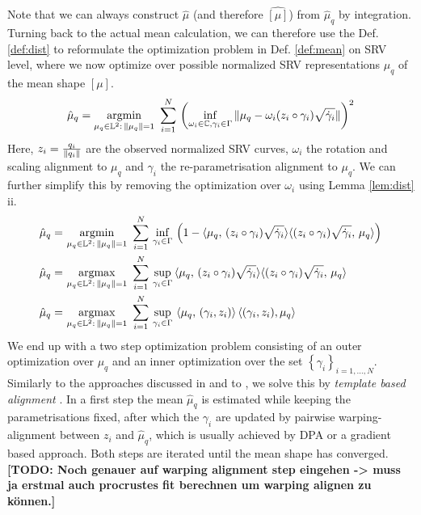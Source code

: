 Note that we can always construct $\hat\mu$ (and therefore $\hat{[\mu]}$) from $\hat\mu_q$ by integration.
Turning back to the actual mean calculation, we can therefore use the Def. \ref{def:dist} to reformulate the optimization problem in Def. \ref{def:mean} on SRV level, where we now optimize over possible normalized SRV representations $\mu_q$ of the mean shape $[\mu]$. 
$$ \hat\mu_q = \operatorname*{argmin}_{\mu_q \in \mathbb{L}^2:\,\lVert\mu_q\rVert = 1}\,\,
  \sum_{i=1}^N \, \left( \inf_{\omega_i \in \mathbb{C}, \gamma_i \in \Gamma} \,
    \lVert\mu_q - \omega_i (z_i \circ \gamma_i) \sqrt{\dot\gamma_i}\rVert \right)^2 $$
Here, $z_i = \frac{q_i}{\lVert q_i\rVert}$ are the observed normalized SRV curves, $\omega_i$ the rotation and scaling alignment to $\mu_q$ and $\gamma_i$ the re-parametrisation alignment to $\mu_q$.
We can further simplify this by removing the optimization over $\omega_i$ using Lemma \ref{lem:dist} ii.
\begin{align*}
  \hat\mu_q = &\, \operatorname*{argmin}_{\mu_q \in \mathbb{L}^2:\,\lVert\mu_q\rVert = 1}\,\,
    \sum_{i=1}^N \,\inf_{\gamma_i \in \Gamma}\, \left(1 - \langle \mu_q,\,(z_i \circ \gamma_i) \sqrt{\dot\gamma_i} \rangle \langle (z_i \circ \gamma_i) \sqrt{\dot\gamma_i},\, \mu_q\rangle \right) \\
  \hat\mu_q = &\, \operatorname*{argmax}_{\mu_q \in \mathbb{L}^2:\,\lVert\mu_q\rVert = 1}\,\,
    \sum_{i=1}^N \,\sup_{\gamma_i \in \Gamma}\, \langle \mu_q,\,(z_i \circ \gamma_i) \sqrt{\dot\gamma_i} \rangle \langle (z_i \circ \gamma_i) \sqrt{\dot\gamma_i},\, \mu_q\rangle \\
  \hat\mu_q = &\, \operatorname*{argmax}_{\mu_q \in \mathbb{L}^2:\,\lVert\mu_q\rVert = 1}\,\,
    \sum_{i=1}^N \,\sup_{\gamma_i \in \Gamma}\, \left\langle \mu_q,\,(\gamma_i,z_i) \right\rangle \left\langle (\gamma_i, z_i), \mu_q \right\rangle
\end{align*}
We end up with a two step optimization problem consisting of an outer optimization over $\mu_q$ and an inner optimization over the set $\left\{\gamma_i\right\}_{i=1,\dots,N}$.
Similarly to the approaches discussed in \cite{SrivastavaKlassen2016} and to \cite{Steyer2021}, we solve this by \emph{template based alignment} \parencite[see e.g.][271]{SrivastavaKlassen2016}.
In a first step the mean $\hat\mu_q$ is estimated while keeping the parametrisations fixed, after which the $\gamma_i$ are updated by pairwise warping-alignment between $z_i$ and $\hat\mu_q$, which is usually achieved by DPA or a gradient based approach.
Both steps are iterated until the mean shape has converged.
\textbf{[TODO: Noch genauer auf warping alignment step eingehen -> muss ja erstmal auch procrustes fit berechnen um warping alignen zu können.]}


